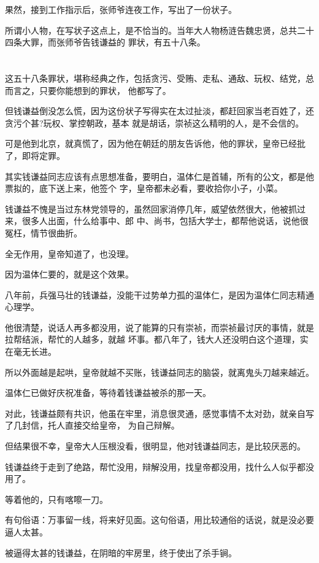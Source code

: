 \documentclass[11pt,a4paper,onecolumn]{article}
\begin{document}
果然，接到工作指示后，张师爷连夜工作，写出了一份状子。

所谓小人物，在写状子这点上，是不恰当的。当年大人物杨涟告魏忠贤，总共二十四条大罪，而张师爷告钱谦益的
罪状，有五十八条。

\section[\thesection]{}

这五十八条罪状，堪称经典之作，包括贪污、受贿、走私、通敌、玩权、结党，总而言之，只要你能想到的罪状，
他都写了。

但钱谦益倒没怎么慌，因为这份状子写得实在太过扯淡，都赶回家当老百姓了，还贪污个甚?玩权、掌控朝政，基本
就是胡话，崇祯这么精明的人，是不会信的。

可是他到北京，就真慌了，因为他在朝廷的朋友告诉他，他的罪状，皇帝已经批了，即将定罪。

其实钱谦益同志应该有点思想准备，要明白，温体仁是首辅，所有的公文，都是他票拟的，底下送上来，他签个
字，皇帝都未必看，要收拾你小子，小菜。

钱谦益不愧是当过东林党领导的，虽然回家消停几年，威望依然很大，他被抓过来，很多人出面，什么给事中、郎
中、尚书，包括大学士，都帮他说话，说他很冤枉，情节很曲折。

全无作用，皇帝知道了，也没理。

因为温体仁要的，就是这个效果。

八年前，兵强马壮的钱谦益，没能干过势单力孤的温体仁，是因为温体仁同志精通心理学。

他很清楚，说话人再多都没用，说了能算的只有崇祯，而崇祯最讨厌的事情，就是拉帮结派，帮忙的人越多，就越
坏事。都八年了，钱大人还没明白这个道理，实在毫无长进。

所以外面越是起哄，皇帝就越不买账，钱谦益同志的脑袋，就离鬼头刀越来越近。

温体仁已做好庆祝准备，等待着钱谦益被杀的那一天。

对此，钱谦益颇有共识，他虽在牢里，消息很灵通，感觉事情不太对劲，就亲自写了几封信，托人直接交给皇帝，
为自己辩解。

但结果很不幸，皇帝大人压根没看，很明显，他对钱谦益同志，是比较厌恶的。

钱谦益终于走到了绝路，帮忙没用，辩解没用，找皇帝都没用，找什么人似乎都没用了。

等着他的，只有喀嚓一刀。

有句俗语：万事留一线，将来好见面。这句俗语，用比较通俗的话说，就是没必要逼人太甚。

被逼得太甚的钱谦益，在阴暗的牢房里，终于使出了杀手锏。
\end{document}
